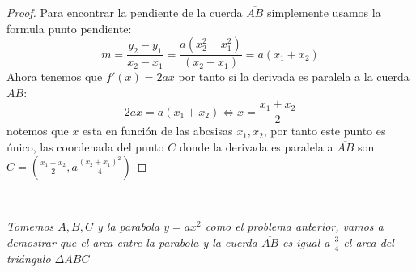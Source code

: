 \documentclass[11pt,letterpaper]{article}
\begin{document}
\begin{proof}
    Para encontrar la pendiente de la cuerda $\overline{AB} $ simplemente usamos la formula punto pendiente:\,\\
    \begin{equation*}
        m=\frac{y_2-y_1}{x_2-x_1}=\frac{a(x_2^2-x_1^2)}{(x_2-x_1)}=a(x_1+x_2)
    \end{equation*}
    Ahora tenemos que $f'(x)=2ax$ por tanto si la derivada es paralela a la cuerda $\overline{AB}$:\,\\
    \begin{equation*}
        2ax=a(x_1+x_2)\iff x=\frac{x_1+x_2}{2}
    \end{equation*} 
    notemos que $x$ esta en funci\'on de las abcsisas $x_1, x_2$, por tanto este punto es \'unico, las coordenada del punto $C$ donde la derivada es paralela a $\overline{AB} $ son $C=\left(\frac{x_1+x_2}{2},a\frac{(x_2+x_1)^2}{4}\right)$
\end{proof}
\,\\
\begin{tcolorbox}[
	title = \textcolor{black}{\textcolor{white}{Problema 2 (Parte 2)}},]
\textit{Tomemos $A,B,C$ y la parabola $y=ax^2$ como el problema anterior, vamos a demostrar que el area entre la parabola y la cuerda $\overline{AB}$ es igual a $\frac{3}{4}$ el area del tri\'angulo $\Delta ABC$}
\end{tcolorbox}
\end{document}
